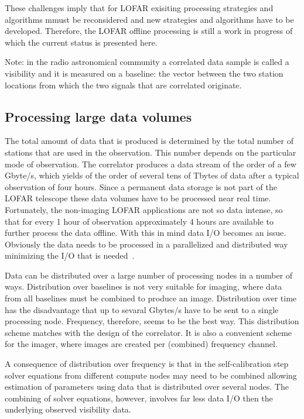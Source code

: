 \documentclass[journal]{IEEEtran}
\begin{document}
These challenges imply that for LOFAR exisiting processing strategies and algorithms mmust be reconsidered and new strategies and algorithms have to be developed. Therefore, the LOFAR offline processing is still a work in progress of which the current status is presented here.

Note: in the radio astronomical community a correlated data sample is called a visibility and it is measured on a baseline: the vector between the two station locations from which the two signals that are correlated originate.
\label{sec:offline}

\subsection{Processing large data volumes}

The total amount of data that is produced is determined by the total number of stations that are used in the observation. This number depends on the particular mode of observation. The correlator produces a data stream of the order of a few Gbyte/s, which yields of the order of several tens of Tbytes of data after a typical observation of four hours. Since a permanent data storage is not part of the LOFAR telescope these data volumes have to be processed near real time. Fortunately, the non-imaging LOFAR applications are not so data intense, so that for every 1 hour of observation approximately 4 hours are available to further process the data offline. With this in mind data I/O becomes an issue. Obviously the data needs to be processed in a parallelized and distributed way minimizing the I/O that is needed~\cite{Loose:08,Diepen:08}.  
 
Data can be distributed over a large number of processing nodes in a number of ways. Distribution over baselines is not very suitable for imaging, where data from all baselines must be combined to produce an image. Distribution over time has the disadvantage that up to sevaral Gbytes/s have to be sent to a single processing node. Frequency, therefore, seems to be the best way. This distribution scheme matches with the design of the correlator. It is also a convenient scheme for the imager, where images are created per (combined) frequency channel.

A consequence of distribution over frequency is that in the self-calibration step solver equations from different compute nodes may need to be combined allowing estimation of parameters using data that is distributed over several nodes. The combining of solver equations, however, involves far less data I/O then the underlying observed visibility data.   
\end{document}
